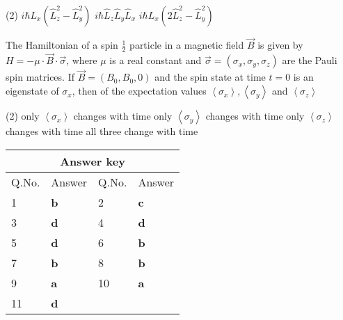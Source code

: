 \begin{enumerate}
\begin{minipage}{\textwidth}
\end{minipage}
\begin{tasks}(2)
	\task[\textbf{A.}] $i \hbar L_{x}\left(\hat{L}_{z}^{2}-\hat{L}_{y}^{2}\right)$
	\task[\textbf{B.}]$i \hbar \hat{L}_{z} \hat{L}_{y} \hat{L}_{x}$
	\task[\textbf{C.}] $i \hbar L_{x}\left(2 \hat{L}_{z}^{2}-\hat{L}_{y}^{2}\right)$
\end{tasks}
\begin{minipage}{\textwidth}
	\item The Hamiltonian of a spin $\frac{1}{2}$ particle in a magnetic field $\vec{B}$ is given by $H=-\mu \cdot \vec{B} \cdot \vec{\sigma}$, where $\mu$ is a real constant and $\vec{\sigma}=\left(\sigma_{x}, \sigma_{y}, \sigma_{z}\right)$ are the Pauli spin matrices. If $\vec{B}=\left(B_{0}, B_{0}, 0\right)$ and the spin state at time $t=0$ is an eigenstate of $\sigma_{x}$, then of the expectation values $\left\langle\sigma_{x}\right\rangle,\left\langle\sigma_{y}\right\rangle$ and $\left\langle\sigma_{z}\right\rangle$
\end{minipage}
\begin{tasks}(2)
	\task[\textbf{A.}] only $\left\langle\sigma_{x}\right\rangle$ changes with time
	\task[\textbf{B.}] only $\left\langle\sigma_{y}\right\rangle$ changes with time
	\task[\textbf{C.}]only $\left\langle\sigma_{z}\right\rangle$ changes with time
	\task[\textbf{D.}]all three change with time
\end{tasks}
\end{enumerate}

\setlength\arrayrulewidth{1pt}
\begin{table}[H]
	\centering
	
	\begin{tabular}{|p{1.5cm}|p{1.5cm}||p{1.5cm}|p{1.5cm}|}
		\hline
		\multicolumn{4}{|c|}{\textbf{Answer key}}\\\hline\hline
		\rowcolor{ocrel}Q.No.&Answer&Q.No.&Answer\\\hline
		1&\textbf{b}&2&\textbf{c}\\\hline
		3&\textbf{d}&4&\textbf{d}\\\hline
		5&\textbf{d}&6&\textbf{b}\\\hline
		7&\textbf{b}&8&\textbf{b}\\\hline
		9&\textbf{a}&10&\textbf{a}\\\hline
		11&\textbf{d}&&\\\hline
	\end{tabular}
\end{table}




